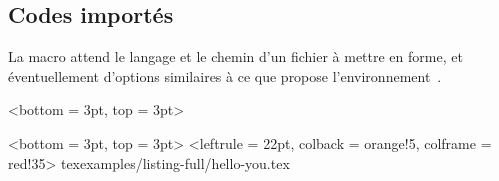 \documentclass{../main/main}
\begin{document}
\subsection{Codes importés}

La macro \tdoclatexin{\tdoccodeinput} attend le langage et le chemin d'un fichier à mettre en forme, et éventuellement d'options similaires à ce que propose l'environnement \,.


\begin{tdocexa}
	\leavevmode

    \begin{tdoclatex}<bottom = 3pt, top = 3pt>
    \end{tdoclatex}
\end{tdocexa}


\begin{tdocexa}
	\leavevmode

    \begin{tdoclatex}<bottom = 3pt, top = 3pt>
\tdoccodeinput[style = solarized-light, linenos]%
              <leftrule = 22pt, colback = orange!5, colframe = red!35>%
              {tex}{examples/listing-full/hello-you.tex}
    \end{tdoclatex}
\end{tdocexa}
\end{document}
